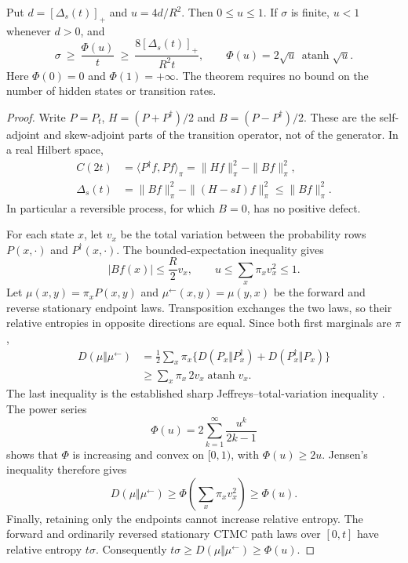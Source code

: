 \begin{theorem}
\label{thm:pa-finite-lag}
Put $d=[\Delta_s(t)]_+$ and $u=4d/R^2$. Then $0\leq u\leq1$.
If $\sigma$ is finite, $u<1$ whenever $d>0$, and
\begin{equation}
 \boxed{\displaystyle
 \sigma\ \geq\ \frac{\Phi(u)}{t}\ \geq\
 \frac{8[\Delta_s(t)]_+}{R^2 t},
 \qquad
 \Phi(u)=2\sqrt{u}\,\operatorname{atanh}\sqrt{u}.}
 \label{eq:pa-direct-bound}
\end{equation}
Here $\Phi(0)=0$ and $\Phi(1)=+\infty$. The theorem requires no bound on
the number of hidden states or transition rates.
\end{theorem}

\begin{proof}
Write $P=P_t$, $H=(P+P^\dagger)/2$ and $B=(P-P^\dagger)/2$.
These are the self-adjoint and skew-adjoint parts of the transition operator,
not of the generator. In a real Hilbert space,
\begin{align}
 C(2t)&=\langle P^\dagger f,Pf\rangle_\pi
       =\|Hf\|_\pi^2-\|Bf\|_\pi^2,\\
 \Delta_s(t)&=\|Bf\|_\pi^2-\|(H-sI)f\|_\pi^2
              \leq\|Bf\|_\pi^2.
 \label{eq:pa-defect-identity}
\end{align}
In particular a reversible process, for which $B=0$, has no positive defect.

For each state $x$, let $v_x$ be the total variation between the probability
rows $P(x,\cdot)$ and $P^\dagger(x,\cdot)$. The bounded-expectation
inequality gives
\[
 |Bf(x)|\leq\frac{R}{2}v_x,
 \qquad u\leq\sum_x\pi_x v_x^2\leq1.
\]
Let $\mu(x,y)=\pi_xP(x,y)$ and $\mu^\leftarrow(x,y)=\mu(y,x)$ be
the forward and reverse stationary endpoint laws. Transposition exchanges the
two laws, so their relative entropies in opposite directions are equal. Since
both first marginals are $\pi$,
\begin{align}
 D(\mu\Vert\mu^\leftarrow)
 &=\frac12\sum_x\pi_x\bigl\{
       D(P_x\Vert P_x^\dagger)+D(P_x^\dagger\Vert P_x)\bigr\}\\
 &\geq\sum_x\pi_x\,2v_x\operatorname{atanh}v_x.
\end{align}
The last inequality is the established sharp Jeffreys--total-variation
inequality \cite{paSason2015}. The power series
\[
 \Phi(u)=2\sum_{k=1}^\infty\frac{u^k}{2k-1}
\]
shows that $\Phi$ is increasing and convex on $[0,1)$, with
$\Phi(u)\geq2u$. Jensen's inequality therefore gives
\[
 D(\mu\Vert\mu^\leftarrow)
 \geq\Phi\!\left(\sum_x\pi_xv_x^2\right)\geq\Phi(u).
\]
Finally, retaining only the endpoints cannot increase relative entropy.
The forward and ordinarily reversed stationary CTMC path laws over $[0,t]$
have relative entropy $t\sigma$. Consequently
$t\sigma\geq D(\mu\Vert\mu^\leftarrow)\geq\Phi(u)$.
\end{proof}

